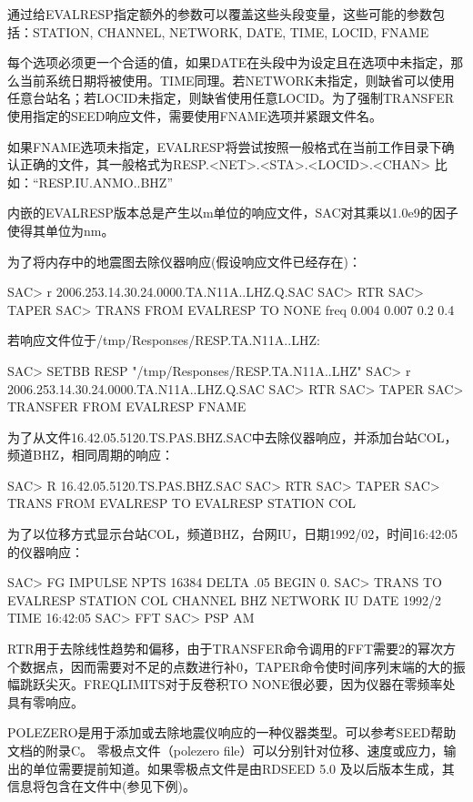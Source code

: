 通过给EVALRESP指定额外的参数可以覆盖这些头段变量，这些可能的参数包括：STATION, CHANNEL, NETWORK, DATE, TIME, LOCID, FNAME

每个选项必须更一个合适的值，如果DATE在头段中为设定且在选项中未指定，那么当前系统日期将被使用。TIME同理。若NETWORK未指定，则缺省可以使用任意台站名；若LOCID未指定，则缺省使用任意LOCID。为了强制TRANSFER使用指定的SEED响应文件，需要使用FNAME选项并紧跟文件名。

如果FNAME选项未指定，EVALRESP将尝试按照一般格式在当前工作目录下确认正确的文件，其一般格式为RESP.<NET>.<STA>.<LOCID>.<CHAN>
比如：``RESP.IU.ANMO..BHZ''

内嵌的EVALRESP版本总是产生以m单位的响应文件，SAC对其乘以1.0e9的因子使得其单位为nm。


为了将内存中的地震图去除仪器响应(假设响应文件已经存在)：
\begin{SACCode}
SAC> r 2006.253.14.30.24.0000.TA.N11A..LHZ.Q.SAC
SAC> RTR
SAC> TAPER
SAC> TRANS FROM EVALRESP TO NONE freq 0.004 0.007 0.2 0.4
\end{SACCode}

若响应文件位于/tmp/Responses/RESP.TA.N11A..LHZ:
\begin{SACCode}
SAC> SETBB RESP "/tmp/Responses/RESP.TA.N11A..LHZ"
SAC> r 2006.253.14.30.24.0000.TA.N11A..LHZ.Q.SAC
SAC> RTR
SAC> TAPER
SAC> TRANSFER FROM EVALRESP FNAME %
\end{SACCode}

为了从文件16.42.05.5120.TS.PAS.BHZ.SAC中去除仪器响应，并添加台站COL，频道BHZ，相同周期的响应：
\begin{SACCode}
SAC> R 16.42.05.5120.TS.PAS.BHZ.SAC
SAC> RTR
SAC> TAPER
SAC> TRANS FROM EVALRESP TO EVALRESP STATION COL
\end{SACCode}

为了以位移方式显示台站COL，频道BHZ，台网IU，日期1992/02，时间16:42:05的仪器响应：
\begin{SACCode}
SAC> FG IMPULSE NPTS 16384 DELTA .05 BEGIN 0.
SAC> TRANS TO EVALRESP STATION COL CHANNEL BHZ NETWORK IU DATE 1992/2 TIME 16:42:05
SAC> FFT
SAC> PSP AM
\end{SACCode}

RTR用于去除线性趋势和偏移，由于TRANSFER命令调用的FFT需要2的幂次方个数据点，因而需要对不足的点数进行补0，TAPER命令使时间序列末端的大的振幅跳跃尖灭。FREQLIMITS对于反卷积TO NONE很必要，因为仪器在零频率处具有零响应。

POLEZERO是用于添加或去除地震仪响应的一种仪器类型。可以参考SEED帮助文档的附录C。
零极点文件（polezero file）可以分别针对位移、速度或应力，输出的单位需要提前知道。如果零极点文件是由RDSEED 5.0 及以后版本生成，其信息将包含在文件中(参见下例)。

